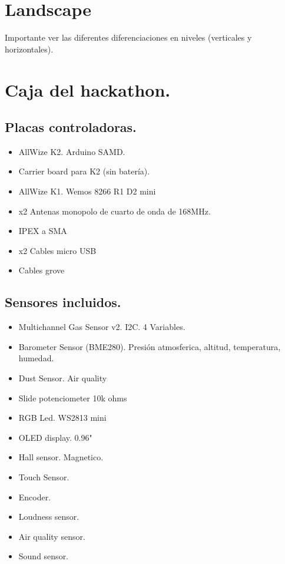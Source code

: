 \documentclass[12pt]{article}
\begin{document}
	\section{Landscape}
	\noindent Importante ver las diferentes diferenciaciones en niveles (verticales y horizontales).
	
	
	\pagebreak
	\section{Caja del hackathon.}
	\subsection{Placas controladoras.}
	\begin{itemize}
		\item AllWize K2. Arduino SAMD. 
		\item Carrier board para K2 (sin batería).
		\item AllWize K1. Wemos 8266 R1 D2 mini 
		\item x2 Antenas monopolo de cuarto de onda de 168MHz.
		\item IPEX a SMA
		\item x2 Cables micro USB
		\item Cables grove
	\end{itemize}
	\subsection{Sensores incluidos.}
	\begin{itemize}
		\item Multichannel Gas Sensor v2. I2C. 4 Variables.
		
		\item Barometer Sensor (BME280). Presión atmosferica, altitud, temperatura, humedad.
		
		\item Dust Sensor. Air quality
		
		\item Slide potenciometer 10k ohms
		
		\item RGB Led. WS2813 mini
		
		\item OLED display. 0.96"
		
		\item Hall sensor. Magnetico.
		
		\item Touch Sensor.
		
		\item Encoder.
		
		\item Loudness sensor.
		
		\item Air quality sensor.
		
		\item Sound sensor.
	\end{itemize}
\end{document}
